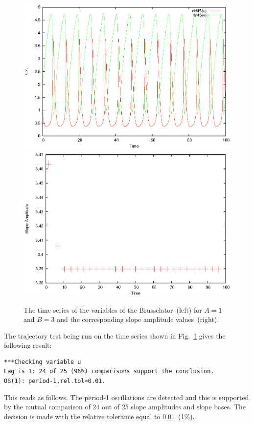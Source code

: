 \documentclass[11pt,a4paper]{article}
\begin{document}
\begin{figure}[h]
  \centering
  \includegraphics[scale=0.45]{sa_ex_bruss_os}
  \includegraphics[scale=0.45]{sa_ex_bruss_os_samp}
  \caption{The time series of the variables of the Brusselator~(left) for $A=1$ and
    $B=3$ and the corresponding slope amplitude values~(right).}
  \label{fig:bruss_os}
\end{figure}

The trajectory test being run on the time series shown in Fig.~\ref{fig:bruss_os}
gives the following result:
\begin{verbatim}
***Checking variable u
Lag is 1: 24 of 25 (96%) comparisons support the conclusion.
OS(1): period-1,rel.tol=0.01.
\end{verbatim}

This reads as follows. The period-1 oscillations are detected and this is supported
by the mutual comparison of 24 out of 25 slope amplitudes and slope bases. The
decision is made with the relative tolerance equal to 0.01~(1\%).
\end{document}
